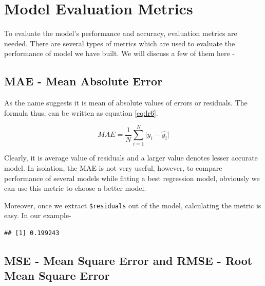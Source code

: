 \documentclass[
]{book}
\newenvironment{Shaded}{\begin{snugshade}}{\end{snugshade}}
\newcommand{\CommentTok}[1]{\textcolor[rgb]{0.56,0.35,0.01}{\textit{#1}}}
\newcommand{\FunctionTok}[1]{\textcolor[rgb]{0.13,0.29,0.53}{\textbf{#1}}}
\newcommand{\NormalTok}[1]{#1}
\newcommand{\SpecialCharTok}[1]{\textcolor[rgb]{0.81,0.36,0.00}{\textbf{#1}}}
\begin{document}
\hypertarget{model-evaluation-metrics}{%
\section{Model Evaluation Metrics}\label{model-evaluation-metrics}}

To evaluate the model's performance and accuracy, evaluation metrics are needed. There are several types of metrics which are used to evaluate the performance of model we have built. We will discuss a few of them here -

\hypertarget{mae---mean-absolute-error}{%
\subsection{MAE - Mean Absolute Error}\label{mae---mean-absolute-error}}

As the name suggests it is mean of absolute values of errors or residuals. The formula thus, can be written as equation \eqref{eq:lr6}.

\begin{equation} 
{MAE} = \frac{1}{N}\sum_{i = 1}^{N}{\lvert}{y_i - \hat{y_i}}{\rvert}
\label{eq:lr6}
\end{equation}

Clearly, it is average value of residuals and a larger value denotes lesser accurate model. In isolation, the MAE is not very useful, however, to compare performance of several models while fitting a best regression model, obviously we can use this metric to choose a better model.

Moreover, once we extract \texttt{\$residuals} out of the model, calculating the metric is easy. In our example-

\begin{Shaded}
\end{Shaded}

\begin{verbatim}
## [1] 0.199243
\end{verbatim}

\hypertarget{mse---mean-square-error-and-rmse---root-mean-square-error}{%
\subsection{MSE - Mean Square Error and RMSE - Root Mean Square Error}\label{mse---mean-square-error-and-rmse---root-mean-square-error}}
\end{document}
